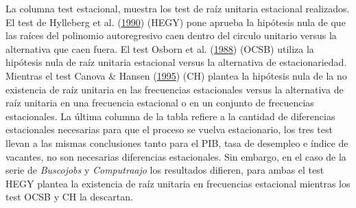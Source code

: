 \documentclass[12pt,oneside]{reedthesis}
\begin{document}
La columna test estacional, muestra los test de raíz unitaria estacional realizados. El test de Hylleberg et al. (\protect\hyperlink{ref-hegy1990}{1990}) (HEGY) pone aprueba la hipótesis nula de que las raíces del polinomio autoregresivo caen dentro del circulo unitario versus la alternativa que caen fuera. El test Osborn et al. (\protect\hyperlink{ref-Osborn1988}{1988}) (OCSB) utiliza la hipótesis nula de raíz unitaria estacional versus la alternativa de estacionariedad. Mientras el test Canova \& Hansen (\protect\hyperlink{ref-Canova1995}{1995}) (CH) plantea la hipótesis nula de la no existencia de raíz unitaria en las frecuencias estacionales versus la alternativa de raíz unitaria en una frecuencia estacional o en un conjunto de frecuencias estacionales. La última columna de la tabla refiere a la cantidad de diferencias estacionales necesarias para que el proceso se vuelva estacionario, los tres test llevan a las mismas conclusiones tanto para el PIB, tasa de desempleo e índice de vacantes, no son necesarias diferencias estacionales. Sin embargo, en el caso de la serie de \emph{Buscojobs} y \emph{Computraajo} los resultados difieren, para ambas el test HEGY plantea la existencia de raíz unitaria en frecuencias estacional mientras los test OCSB y CH la descartan.
\end{document}
